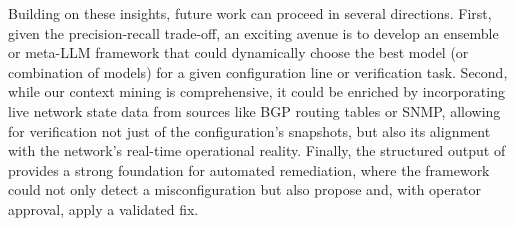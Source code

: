 Building on these insights, future work can proceed in several directions. First, given the precision-recall trade-off, an exciting avenue is to develop an ensemble or meta-LLM framework that could dynamically choose the best model (or combination of models) for a given configuration line or verification task. Second, while our context mining is comprehensive, it could be enriched by incorporating live network state data from sources like BGP routing tables or SNMP, allowing for verification not just of the configuration's snapshots, but also its alignment with the network's real-time operational reality. Finally, the structured output of \sysname{} provides a strong foundation for automated remediation, where the framework could not only detect a misconfiguration but also propose and, with operator approval, apply a validated fix.